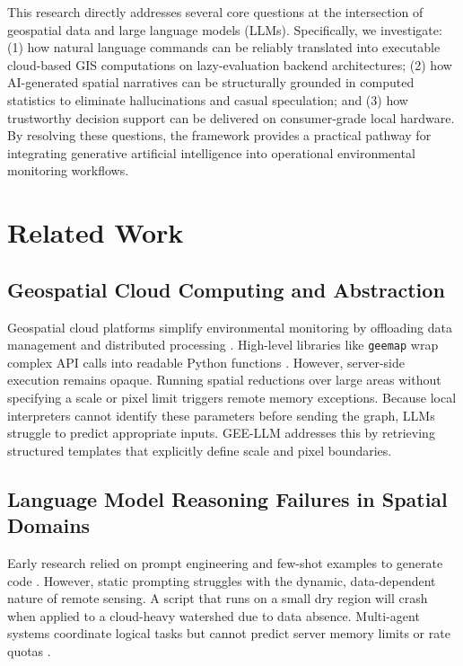 \documentclass[pdflatex,sn-mathphys-ay]{sn-jnl}
\begin{document}
This research directly addresses several core questions at the intersection of geospatial data and large language models (LLMs). Specifically, we investigate: (1) how natural language commands can be reliably translated into executable cloud-based GIS computations on lazy-evaluation backend architectures; (2) how AI-generated spatial narratives can be structurally grounded in computed statistics to eliminate hallucinations and casual speculation; and (3) how trustworthy decision support can be delivered on consumer-grade local hardware. By resolving these questions, the framework provides a practical pathway for integrating generative artificial intelligence into operational environmental monitoring workflows.






\section{Related Work}\label{sec:related}

\subsection{Geospatial Cloud Computing and Abstraction}\label{sec:rel_gee}
Geospatial cloud platforms simplify environmental monitoring by offloading data management and distributed processing \citep{Tamiminia2020, Mutanga2019, Kumar2018}. High-level libraries like \texttt{geemap} wrap complex API calls into readable Python functions \citep{Wu2020}. However, server-side execution remains opaque. Running spatial reductions over large areas without specifying a scale or pixel limit triggers remote memory exceptions. Because local interpreters cannot identify these parameters before sending the graph, LLMs struggle to predict appropriate inputs. GEE-LLM addresses this by retrieving structured templates that explicitly define scale and pixel boundaries.

\subsection{Language Model Reasoning Failures in Spatial Domains}\label{sec:rel_llm}
Early research relied on prompt engineering and few-shot examples to generate code \citep{Chen2021, Roziere2024, Chowdhery2023}. However, static prompting struggles with the dynamic, data-dependent nature of remote sensing. A script that runs on a small dry region will crash when applied to a cloud-heavy watershed due to data absence. Multi-agent systems coordinate logical tasks but cannot predict server memory limits or rate quotas \citep{Wu2025}. 
\end{document}
